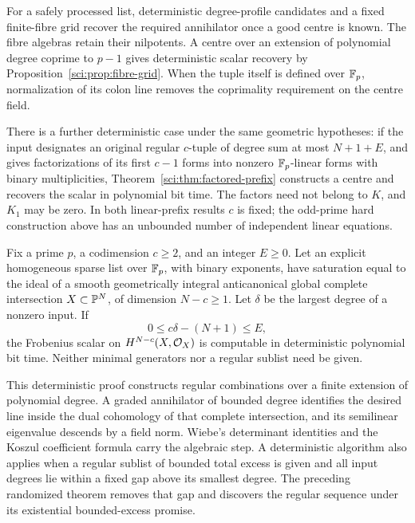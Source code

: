For a safely processed list, deterministic degree-profile candidates
and a fixed finite-fibre grid recover the required annihilator once a
good centre is known. The fibre algebras retain their nilpotents.
A centre over an extension of polynomial degree coprime to $p-1$
gives deterministic scalar recovery by
Proposition~\ref{sci:prop:fibre-grid}. When the tuple itself is defined
over $\mathbb F_p$, normalization of its colon line removes the coprimality
requirement on the centre field.

There is a further deterministic case under the same geometric
hypotheses: if the input designates an original regular $c$-tuple
of degree sum at most $N+1+E$, and gives factorizations of its first
$c-1$ forms into nonzero $\mathbb F_p$-linear forms with binary multiplicities,
Theorem~\ref{sci:thm:factored-prefix} constructs a centre and recovers
the scalar in polynomial bit time. The factors need not belong to
$K$, and $K_1$ may be zero. In both linear-prefix results $c$ is fixed;
the odd-prime hard construction above has an unbounded number of
independent linear equations.

\begin{theorem}\label{thm:saturation-ci-intro}
Fix a prime $p$, a codimension $c\ge2$, and an integer $E\ge0$. Let an explicit homogeneous sparse list over $\mathbb F_p$, with binary exponents, have saturation equal to the ideal of a smooth geometrically integral anticanonical global complete intersection $X\subset\mathbb P^N$, of dimension $N-c\ge1$. Let $\delta$ be the largest degree of a nonzero input. If
\[
0\le c\delta-(N+1)\le E,
\]
the Frobenius scalar on $H^{N-c}(X,\mathcal O_X)$ is computable in deterministic polynomial bit time. Neither minimal generators nor a regular sublist need be given.
\end{theorem}

This deterministic proof constructs regular combinations over a finite
extension of polynomial degree. A graded annihilator of bounded degree
identifies the desired line inside the dual cohomology of that complete
intersection, and its semilinear eigenvalue descends by a field norm.
Wiebe's determinant identities and the Koszul coefficient formula carry
the algebraic step. A deterministic algorithm also applies when a regular
sublist of bounded total excess is given and all input degrees lie within
a fixed gap above its smallest degree. The preceding randomized theorem
removes that gap and discovers the regular sequence under its existential
bounded-excess promise.

